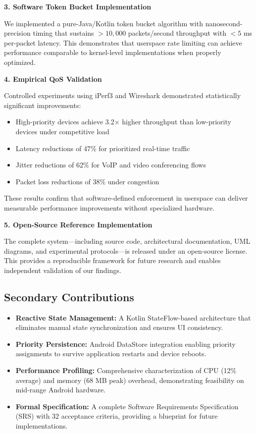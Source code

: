 \textbf{3. Software Token Bucket Implementation}

We implemented a pure-Java/Kotlin token bucket algorithm with nanosecond-precision timing that sustains $>10,000$ packets/second throughput with $<5$ ms per-packet latency. This demonstrates that userspace rate limiting can achieve performance comparable to kernel-level implementations when properly optimized.

\textbf{4. Empirical QoS Validation}

Controlled experiments using iPerf3 and Wireshark demonstrated statistically significant \qos improvements:
\begin{itemize}
    \item High-priority devices achieve 3.2× higher throughput than low-priority devices under competitive load
    \item Latency reductions of 47\% for prioritized real-time traffic
    \item Jitter reductions of 62\% for VoIP and video conferencing flows
    \item Packet loss reductions of 38\% under congestion
\end{itemize}

These results confirm that software-defined \qos enforcement in userspace can deliver measurable performance improvements without specialized hardware.

\textbf{5. Open-Source Reference Implementation}

The complete system—including source code, architectural documentation, UML diagrams, and experimental protocols—is released under an open-source license. This provides a reproducible framework for future research and enables independent validation of our findings.

\subsection{Secondary Contributions}

\begin{itemize}
    \item \textbf{Reactive State Management:} A Kotlin StateFlow-based architecture that eliminates manual state synchronization and ensures UI consistency.
    
    \item \textbf{Priority Persistence:} Android DataStore integration enabling priority assignments to survive application restarts and device reboots.
    
    \item \textbf{Performance Profiling:} Comprehensive characterization of CPU (12\% average) and memory (68 MB peak) overhead, demonstrating feasibility on mid-range Android hardware.
    
    \item \textbf{Formal Specification:} A complete Software Requirements Specification (SRS) with 32 acceptance criteria, providing a blueprint for future implementations.
\end{itemize}


